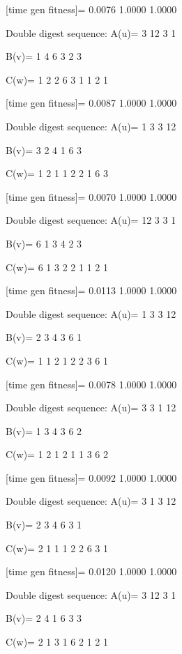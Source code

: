 [time gen fitness]=
    0.0076    1.0000    1.0000

Double digest sequence:
A(u)=
     3    12     3     1

B(v)=
     1     4     6     3     2     3

C(w)=
     1     2     2     6     3     1     1     2     1

[time gen fitness]=
    0.0087    1.0000    1.0000

Double digest sequence:
A(u)=
     1     3     3    12

B(v)=
     3     2     4     1     6     3

C(w)=
     1     2     1     1     2     2     1     6     3

[time gen fitness]=
    0.0070    1.0000    1.0000

Double digest sequence:
A(u)=
    12     3     3     1

B(v)=
     6     1     3     4     2     3

C(w)=
     6     1     3     2     2     1     1     2     1

[time gen fitness]=
    0.0113    1.0000    1.0000

Double digest sequence:
A(u)=
     1     3     3    12

B(v)=
     2     3     4     3     6     1

C(w)=
     1     1     2     1     2     2     3     6     1

[time gen fitness]=
    0.0078    1.0000    1.0000

Double digest sequence:
A(u)=
     3     3     1    12

B(v)=
     1     3     4     3     6     2

C(w)=
     1     2     1     2     1     1     3     6     2

[time gen fitness]=
    0.0092    1.0000    1.0000

Double digest sequence:
A(u)=
     3     1     3    12

B(v)=
     2     3     4     6     3     1

C(w)=
     2     1     1     1     2     2     6     3     1

[time gen fitness]=
    0.0120    1.0000    1.0000

Double digest sequence:
A(u)=
     3    12     3     1

B(v)=
     2     4     1     6     3     3

C(w)=
     2     1     3     1     6     2     1     2     1

